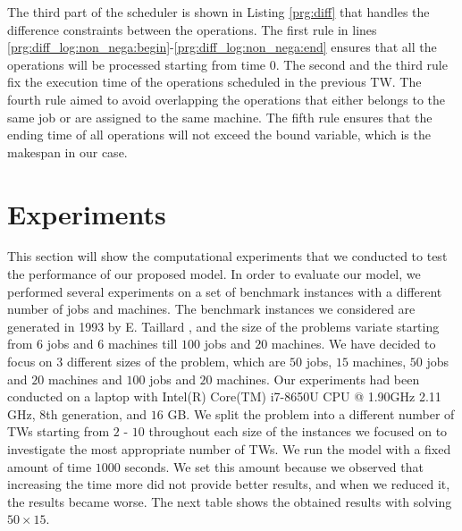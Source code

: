 \documentclass{tlp} %
\begin{document}
% 

The third part of the scheduler is shown in Listing \ref{prg:diff} that handles the difference constraints between the operations. The first rule in lines \ref{prg:diff_log:non_nega:begin}-\ref{prg:diff_log:non_nega:end} ensures that all the operations will be processed starting from time $0$. The second and the third rule fix the execution time of the operations scheduled in the previous TW. The fourth rule aimed to avoid overlapping the operations that either belongs to the same job or are assigned to the same machine. The fifth rule ensures that the ending time of all operations will not exceed the bound variable, which is the makespan in our case. 


\section{Experiments}\label{sec:experiments}
This section will show the computational experiments that we conducted to test the performance of our proposed model. In order to evaluate our model, we performed several experiments on a set of benchmark instances with a different number of jobs and machines. The benchmark instances we considered are generated in 1993 by E. Taillard \cite{taillard1993benchmarks}, and the size of the problems variate starting from $6$ jobs and $6$ machines till $100$ jobs and $20$ machines. We have decided to focus on $3$ different sizes of the problem, which are $50$ jobs, $15$ machines, $50$ jobs and $20$ machines and $100$ jobs and $20$ machines. Our experiments had been conducted on a laptop with Intel(R) Core(TM) i7-8650U CPU @ 1.90GHz 2.11 GHz, 8th generation, and $16$ GB. We split the problem into a different number of TWs starting from $2$ - $10$ throughout each size of the instances we focused on to investigate the most appropriate number of TWs. We run the model with a fixed amount of time $1000$ seconds. We set this amount because we observed that increasing the time more did not provide better results, and when we reduced it, the results became worse. The next table shows the obtained results with solving $50 \times 15$.
\end{document}
